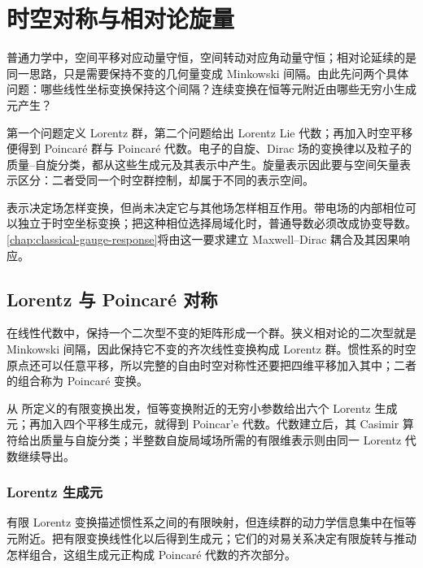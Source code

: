 \chapter{时空对称与相对论旋量}\label{chap:classical-fields}

普通力学中，空间平移对应动量守恒，空间转动对应角动量守恒；相对论延续的是同一思路，只是需要保持不变的几何量变成 Minkowski 间隔。由此先问两个具体问题：哪些线性坐标变换保持这个间隔？连续变换在恒等元附近由哪些无穷小生成元产生？

第一个问题定义 Lorentz 群，第二个问题给出 Lorentz Lie 代数；再加入时空平移便得到 Poincaré 群与 Poincaré 代数。电子的自旋、Dirac 场的变换律以及粒子的质量--自旋分类，都从这些生成元及其表示中产生。旋量表示因此要与空间矢量表示区分：二者受同一个时空群控制，却属于不同的表示空间。

表示决定场怎样变换，但尚未决定它与其他场怎样相互作用。带电场的内部相位可以独立于时空坐标变换；把这种相位选择局域化时，普通导数必须改成协变导数。\cref{chap:classical-gauge-response}将由这一要求建立 Maxwell--Dirac 耦合及其因果响应。

\section{Lorentz 与 Poincar\'e 对称}

在线性代数中，保持一个二次型不变的矩阵形成一个群。狭义相对论的二次型就是 Minkowski 间隔，因此保持它不变的齐次线性变换构成 Lorentz 群。惯性系的时空原点还可以任意平移，所以完整的自由时空对称性还要把四维平移加入其中；二者的组合称为 Poincar\'e 变换。

从 所定义的有限变换出发，恒等变换附近的无穷小参数给出六个 Lorentz 生成元；再加入四个平移生成元，就得到 Poincar'e 代数。代数建立后，其 Casimir 算符给出质量与自旋分类；半整数自旋局域场所需的有限维表示则由同一 Lorentz 代数继续导出。

\subsection{Lorentz 生成元}

有限 Lorentz 变换描述惯性系之间的有限映射，但连续群的动力学信息集中在恒等元附近。把有限变换线性化以后得到生成元；它们的对易关系决定有限旋转与推动怎样组合，这组生成元正构成 Poincar\'e 代数的齐次部分。



